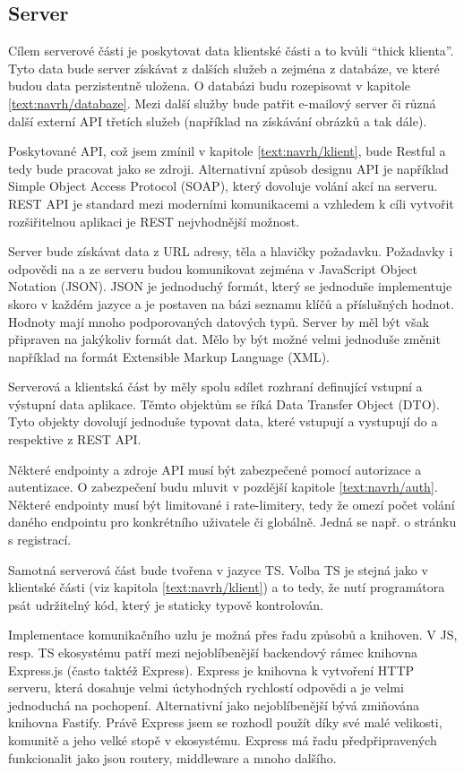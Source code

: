 \subsection{Server}\label{text:navrh/server}

Cílem serverové části je poskytovat data klientské části a to kvůli \enquote{thick klienta}. 
Tyto data bude server získávat z dalších služeb a zejména z databáze, ve které budou data perzistentně uložena.
O databázi budu rozepisovat v kapitole \ref{text:navrh/databaze}.
Mezi další služby bude patřit e-mailový server či různá další externí API třetích služeb (například na získávání obrázků a tak dále).

Poskytované API, což jsem zmínil v kapitole \ref{text:navrh/klient}, bude Restful a tedy bude pracovat jako se zdroji. 
Alternativní způsob designu API je například Simple Object Access Protocol (SOAP), který dovoluje volání akcí na serveru.
REST API je standard mezi moderními komunikacemi a vzhledem k cíli vytvořit rozšiřitelnou aplikaci je REST nejvhodnější možnost.

Server bude získávat data z URL adresy, těla a hlavičky požadavku.
Požadavky i odpovědi na a ze serveru budou komunikovat zejména v JavaScript Object Notation (JSON).
JSON je jednoduchý formát, který se jednoduše implementuje skoro v každém jazyce a je postaven na bázi seznamu klíčů a příslušných hodnot.
Hodnoty mají mnoho podporovaných datových typů.
Server by měl být však připraven na jakýkoliv formát dat.
Mělo by být možné velmi jednoduše změnit například na formát Extensible Markup Language (XML).

Serverová a klientská část by měly spolu sdílet rozhraní definující vstupní a výstupní data aplikace.
Těmto objektům se říká Data Transfer Object (DTO).
Tyto objekty dovolují jednoduše typovat data, které vstupují a vystupují do a respektive z REST API.

Některé endpointy a zdroje API musí být zabezpečené pomocí autorizace a autentizace. 
O zabezpečení budu mluvit v pozdější kapitole \ref{text:navrh/auth}.
Některé endpointy musí být limitované i rate-limitery, tedy že omezí počet volání daného endpointu pro konkrétního uživatele či globálně.
Jedná se např. o stránku s registrací.

Samotná serverová část bude tvořena v jazyce TS.
Volba TS je stejná jako v klientské části (viz kapitola \ref{text:navrh/klient}) a to tedy, že nutí programátora psát udržitelný kód, který je staticky typově kontrolován.

Implementace komunikačního uzlu je možná přes řadu způsobů a knihoven.
V JS, resp. TS ekosystému patří mezi nejoblíbenější backendový rámec knihovna Express.js (často taktéž Express).
Express je knihovna k vytvoření HTTP serveru, která dosahuje velmi úctyhodných rychlostí odpovědi a je velmi jednoduchá na pochopení.
Alternativní jako nejoblíbenější bývá zmiňována knihovna Fastify.
Právě Express jsem se rozhodl použít díky své malé velikosti, komunitě a jeho velké stopě v ekosystému.
Express má řadu předpřipravených funkcionalit jako jsou routery, middleware a mnoho dalšího.

